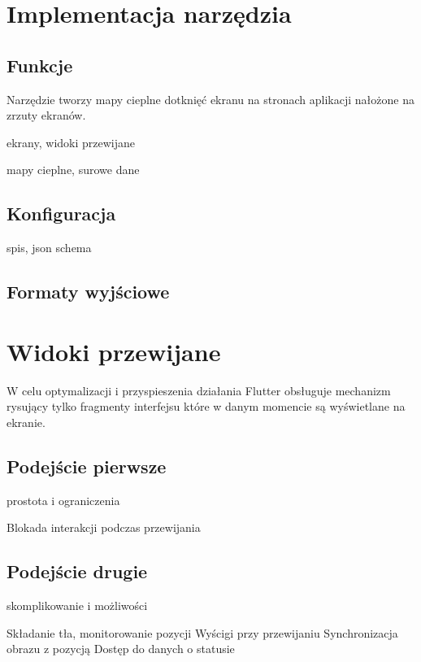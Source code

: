 \section{Implementacja narzędzia}

\subsection{Funkcje}

Narzędzie tworzy mapy cieplne dotknięć ekranu na stronach aplikacji nałożone na zrzuty ekranów. 

ekrany, widoki przewijane

mapy cieplne, surowe dane

\subsection{Konfiguracja}
spis, json schema

\subsection{Formaty wyjściowe}

\section{Widoki przewijane}
W celu optymalizacji i przyspieszenia działania Flutter obsługuje mechanizm rysujący tylko fragmenty interfejsu które w danym momencie są wyświetlane na ekranie.

\subsection{Podejście pierwsze}
prostota i ograniczenia

Blokada interakcji podczas przewijania

\subsection{Podejście drugie}
skomplikowanie i możliwości

Składanie tła, monitorowanie pozycji
Wyścigi przy przewijaniu
Synchronizacja obrazu z pozycją
Dostęp do danych o statusie
